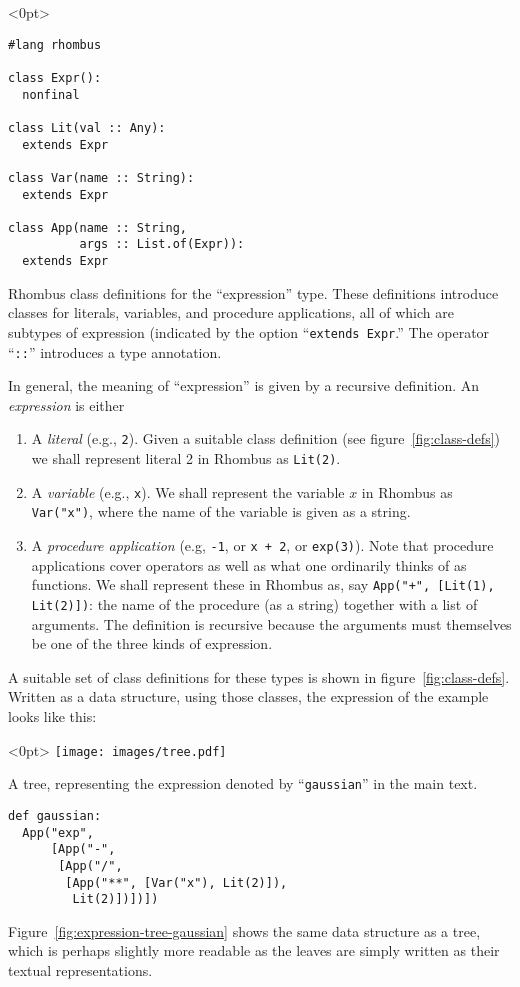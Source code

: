 \documentclass[11pt, a4paper]{article}
\newcommand{\cd}[1]{\texttt{#1}}
\begin{document}
\begin{marginfigure}<0pt>
  \footnotesize
\begin{verbatim}
#lang rhombus

class Expr():
  nonfinal

class Lit(val :: Any):
  extends Expr

class Var(name :: String):
  extends Expr

class App(name :: String,
          args :: List.of(Expr)):
  extends Expr
\end{verbatim}
  \caption{Rhombus class definitions for the ``expression''
    type. These definitions introduce classes for literals, variables,
    and procedure applications, all of which are subtypes of
    expression (indicated by the option ``\cd{extends Expr}.'' The
    operator ``\cd{::}'' introduces a type annotation.\label{fig:class-defs}}
\end{marginfigure}
In general, the meaning of ``expression'' is given by a recursive
definition. An \emph{expression} is either
\begin{enumerate}
\item A \emph{literal} (e.g., \cd{2}). Given a suitable class
  definition (see figure~\ref{fig:class-defs}) we shall represent
  literal 2 in Rhombus as \cd{Lit(2)}.
\item A \emph{variable} (e.g., \cd{x}). We shall represent the variable
  $x$ in Rhombus as \cd{Var("x")}, where the name of the variable is
  given as a string.
\item A \emph{procedure application} (e.g, \cd{-1}, or \cd{x + 2}, or
  \cd{exp(3)}). Note that procedure applications cover operators as well
  as what one ordinarily thinks of as functions. We shall represent
  these in Rhombus as, say \cd{App("+", [Lit(1), Lit(2)])}: the name
  of the procedure (as a string) together with a list of
  arguments. The definition is recursive because the arguments must
  themselves be one of the three kinds of expression.
\end{enumerate}

A suitable set of class definitions for these types is shown in
figure~\ref{fig:class-defs}. Written as a data structure, using those
classes, the expression of the example looks like this:
\begin{marginfigure}<0pt>
  \centering
  \texttt{[image: images/tree.pdf]}
  \caption{A tree, representing the expression denoted by
    ``\cd{gaussian}'' in the main text.\label{fig:expression-tree-gaussian}}
\end{marginfigure}
\begin{verbatim}
def gaussian:
  App("exp",
      [App("-",
       [App("/",
        [App("**", [Var("x"), Lit(2)]),
         Lit(2)])])])
\end{verbatim}
Figure~\ref{fig:expression-tree-gaussian} shows the same data
structure as a tree, which is perhaps slightly more
readable as the leaves are simply written as their textual
representations.
\end{document}
